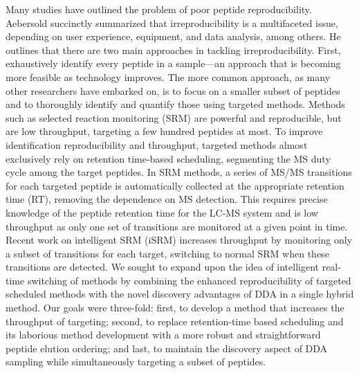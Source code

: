 Many studies have outlined the problem of poor peptide reproducibility.\cite{liu,mrm,tabb,bigtime,pachl} Aebersold succinctly summarized that irreproducibility is a multifaceted issue, depending on user experience, equipment, and data analysis, among others.\cite{aebersold} He outlines that there are two main approaches in tackling irreproducibility. First, exhaustively identify every peptide in a sample---an approach that is becoming more feasible as technology improves.\cite{thakur,nagaraj,onehour} The more common approach, as many other researchers have embarked on, is to focus on a smaller subset of peptides and to thoroughly identify and quantify those using targeted methods.\cite{savitski} Methods such as selected reaction monitoring (SRM) are powerful and reproducible, but are low throughput, targeting a few hundred peptides at most.\cite{lange,picotti1,picotti2,picotti3,bigsrm} To improve identification reproducibility and throughput, targeted methods almost exclusively rely on retention time-based scheduling, segmenting the MS duty cycle among the target peptides. In SRM methods, a series of MS/MS transitions for each targeted peptide is automatically collected at the appropriate retention time (RT), removing the dependence on MS detection. This requires precise knowledge of the peptide retention time for the LC-MS system and is low throughput as only one set of transitions are monitored at a given point in time. Recent work on intelligent SRM (iSRM) increases throughput by monitoring only a subset of transitions for each target, switching to normal SRM when these transitions are detected.\cite{isrm} We sought to expand upon the idea of intelligent real-time switching of methods by combining the enhanced reproducibility of targeted scheduled methods with the novel discovery advantages of DDA in a single hybrid method. Our goals were three-fold: first, to develop a method that increases the throughput of targeting; second, to replace retention-time based scheduling and its laborious method development with a more robust and straightforward peptide elution ordering; and last, to maintain the discovery aspect of DDA sampling while simultaneously targeting a subset of peptides.

